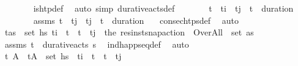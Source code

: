 \begin{isabellebody}
\ \ \ \ \ \ \isamarkupfalse%
\ is{\isacharunderscore}{\kern0pt}htp{\isacharunderscore}{\kern0pt}def\ \isamarkupfalse%
\ {\isacharparenleft}{\kern0pt}auto\ simp{\isacharcolon}{\kern0pt}\ durative{\isacharunderscore}{\kern0pt}acts{\isacharunderscore}{\kern0pt}def{\isacharparenright}{\kern0pt}\isanewline
\ \ \ \ \isamarkupfalse%
\ \isamarkupfalse%
\ {\isachardoublequoteopen}t\isactrlsub {\isasympi}\ {\isasymle}\ t\isactrlsub i\ {\isasymand}\ t\isactrlsub j\ {\isasymle}\ t\isactrlsub {\isasympi}\ {\isacharplus}{\kern0pt}\ {\isacharparenleft}{\kern0pt}duration\ {\isasympi}{\isacharparenright}{\kern0pt}{\isachardoublequoteclose}\isanewline
\ \ \ \ \ \ \isamarkupfalse%
\ assms\ {\isacartoucheopen}t\isactrlsub {\isasympi}\ {\isacharless}{\kern0pt}\ t\isactrlsub j\ {\isasymand}\ t\isactrlsub j\ {\isasymle}\ t\isactrlsub {\isasympi}\ {\isacharplus}{\kern0pt}\ {\isacharparenleft}{\kern0pt}duration\ {\isasympi}{\isacharparenright}{\kern0pt}{\isacartoucheclose}\ \isamarkupfalse%
\ consec{\isacharunderscore}{\kern0pt}htps{\isacharunderscore}{\kern0pt}def\ \isamarkupfalse%
\ auto\isanewline
\ \ \ \ \isamarkupfalse%
\ \isamarkupfalse%
\ {\isachardoublequoteopen}{\isasymexists}{\isacharparenleft}{\kern0pt}t{\isacharprime}{\kern0pt}{\isacharcomma}{\kern0pt}as{\isacharparenright}{\kern0pt}\ {\isasymin}\ set\ hs{\isachardot}{\kern0pt}\ t\isactrlsub i\ {\isacharless}{\kern0pt}\ t{\isacharprime}{\kern0pt}\ {\isasymand}\ t{\isacharprime}{\kern0pt}\ {\isacharless}{\kern0pt}\ t\isactrlsub j\ {\isasymand}\ the\ {\isacharparenleft}{\kern0pt}res{\isacharunderscore}{\kern0pt}inst{\isacharunderscore}{\kern0pt}snap{\isacharunderscore}{\kern0pt}action\ {\isasympi}\ Over{\isacharunderscore}{\kern0pt}All{\isacharparenright}{\kern0pt}\ {\isasymin}\ set\ as{\isachardoublequoteclose}\isanewline
\ \ \ \ \ \ \isamarkupfalse%
\ assms\ {\isacartoucheopen}{\isacharparenleft}{\kern0pt}t\isactrlsub {\isasympi}{\isacharcomma}{\kern0pt}{\isasympi}{\isacharparenright}{\kern0pt}\ {\isasymin}\ durative{\isacharunderscore}{\kern0pt}acts\ {\isasympi}s{\isacartoucheclose}\ \isamarkupfalse%
\ ind{\isacharunderscore}{\kern0pt}happ{\isacharunderscore}{\kern0pt}seq{\isacharunderscore}{\kern0pt}def\ \isamarkupfalse%
\ auto\isanewline
\ \ \ \ \isanewline
\ \ \ \ \isamarkupfalse%
\ \isamarkupfalse%
\ t\ A\ \ {\isachardoublequoteopen}{\isacharparenleft}{\kern0pt}t{\isacharcomma}{\kern0pt}A{\isacharparenright}{\kern0pt}\ {\isasymin}\ set\ hs{\isachardoublequoteclose}\ \ {\isachardoublequoteopen}t\isactrlsub i\ {\isacharless}{\kern0pt}\ t\ {\isasymand}\ t\ {\isacharless}{\kern0pt}\ t\isactrlsub j{\isachardoublequoteclose}\ \isanewline

\end{isabellebody}
